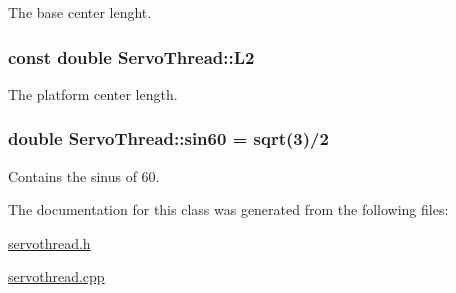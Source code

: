 The base center lenght. 

\hypertarget{class_servo_thread_a3d51c16b1f498b48a6ecbfaadaba6ed2}{}
\subsubsection[{L2}]{\setlength{\rightskip}{0pt plus 5cm}const double Servo\+Thread\+::\+L2\hspace{0.3cm}{\ttfamily [private]}}\label{class_servo_thread_a3d51c16b1f498b48a6ecbfaadaba6ed2}


The platform center length. 

\hypertarget{class_servo_thread_addbe4545236e5ded8c4956f2e2d52a84}{}
\subsubsection[{sin60}]{\setlength{\rightskip}{0pt plus 5cm}double Servo\+Thread\+::sin60 = sqrt(3)/2\hspace{0.3cm}{\ttfamily [private]}}\label{class_servo_thread_addbe4545236e5ded8c4956f2e2d52a84}


Contains the sinus of 60. 



The documentation for this class was generated from the following files\+:\begin{DoxyCompactItemize}
\item 
\hyperlink{servothread_8h}{servothread.\+h}\item 
\hyperlink{servothread_8cpp}{servothread.\+cpp}\end{DoxyCompactItemize}
